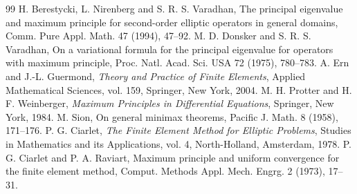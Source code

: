 \documentclass[10pt,a4paper]{amsart}
\begin{document}
\begin{thebibliography}{99}
 H. Berestycki, L. Nirenberg and S. R. S. Varadhan, The principal eigenvalue and maximum principle for second-order elliptic operators in general domains, Comm. Pure Appl. Math. 47 (1994), 47--92.
 M. D. Donsker and S. R. S. Varadhan, On a variational formula for the principal eigenvalue for operators with maximum principle, Proc. Natl. Acad. Sci. USA 72 (1975), 780--783.
 A. Ern and J.-L. Guermond, \textit{Theory and Practice of Finite Elements}, Applied Mathematical Sciences, vol. 159, Springer, New York, 2004.
 M. H. Protter and H. F. Weinberger, \textit{Maximum Principles in Differential Equations}, Springer, New York, 1984.
 M. Sion, On general minimax theorems, Pacific J. Math. 8 (1958), 171--176.
 P. G. Ciarlet, \textit{The Finite Element Method for Elliptic Problems}, Studies in Mathematics and its Applications, vol. 4, North-Holland, Amsterdam, 1978.
 P. G. Ciarlet and P. A. Raviart, Maximum principle and uniform convergence for the finite element method, Comput. Methods Appl. Mech. Engrg. 2 (1973), 17--31.
\end{thebibliography}
\end{document}
